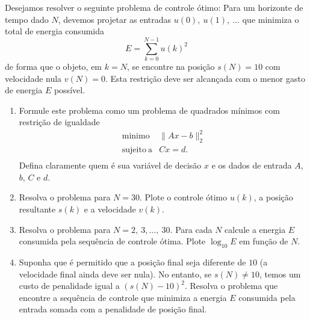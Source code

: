 \begin{problem}
Desejamos resolver o seguinte problema de controle ótimo: Para um horizonte de tempo dado $N$, devemos projetar as entradas $u(0),~u(1),~\ldots$ que minimiza o total de energia consumida
         \begin{equation*}
           E = \sum_{k=0}^{N-1} u(k)^2
         \end{equation*}
de forma que o objeto, em $k=N$, se encontre na posição $s(N) = 10$ com velocidade nula $v(N) = 0$. Esta restrição deve ser alcançada com o menor gasto de energia $E$ possível.
\begin{enumerate}[label=(\alph*)]
           \item Formule este problema como um problema de quadrados mínimos com restrição de igualdade
           \begin{equation*}
             \begin{array}{rl}
             \mathrm{minimo} & \|Ax-b\|_2^2 \\
             \mathrm{sujeito~a} & Cx = d. \\
             \end{array}
           \end{equation*}
Defina claramente quem é sua variável de decisão $x$ e os dados de entrada $A$, $b$, $C$ e $d$.
           \item Resolva o problema para $N = 30$. Plote o controle ótimo $u(k)$, a posição resultante $s(k)$ e a velocidade $v(k)$.
           \item Resolva o problema para $N = 2,~3, \ldots,~30$. Para cada $N$ calcule a energia $E$ consumida pela sequência de controle ótima. Plote $\log_{10}E$ em função de $N$.
           \item Suponha que é permitido que a posição final seja diferente de $10$ (a velocidade final ainda deve ser nula). No entanto, se $s(N) \neq 10$, temos um custo de penalidade igual a $(s(N)-10)^2$. Resolva o problema que encontre a sequência de controle que minimiza a energia $E$ consumida pela entrada somada com a penalidade de posição final.
\end{enumerate}
\end{problem}